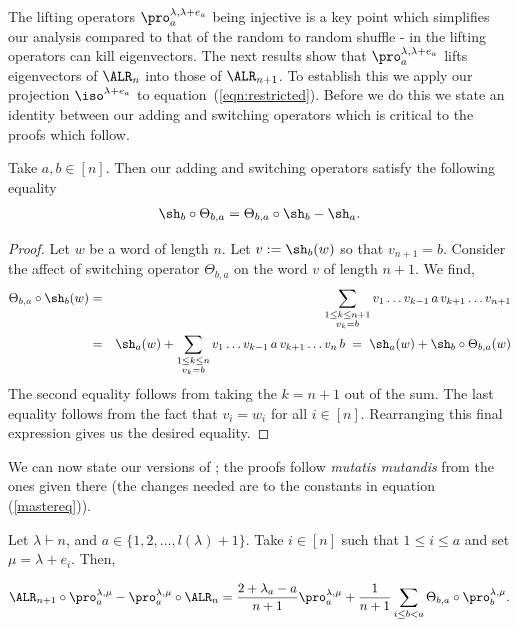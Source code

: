 \documentclass[11pt]{report}
\begin{document}
The lifting operators $\pro^{\lambda, \lambda + e_{a}}_{a}$ 
being injective is a key point which simplifies our analysis  
compared to that of the random to random shuffle - in \cite{dieker2018spectral} the lifting operators can kill 
eigenvectors. The next results 
show that $\pro_{a}^{\lambda,\lambda+e_{a}}$ lifts eigenvectors 
of 
$\ALR_{n}$ into those of $\ALR_{n+1}$. 
To establish this we apply our projection $\iso^{\lambda+e_{a}}$ to 	equation~(\ref{eqn:restricted}). Before we do this we state an identity between our adding and switching operators which is critical to the proofs which follow.

\begin{lemma}
	Take $a,b \in [n]$. Then our adding and switching operators satisfy the following equality
	\begin{eqnarray}
	\sh_{b} \circ \Theta_{b,a} = \Theta_{b,a} \circ \sh_{b}  -\sh_{a} .\label{chpt5:eqn:addswtichequally}
	\end{eqnarray}
\end{lemma}
\begin{proof}
	Let $w$ be a word of length $n$. Let $v := \sh_{b}(w)$ so that $v_{n+1} =b$. Consider the affect of switching operator $\Theta_{b,a}$ on the word $v$ of length $n+1$. We find,
	\begin{eqnarray*}
		\Theta_{b,a} \circ \sh_{b}(w)  & =  &\sum_{\substack{1\leq k \leq n+1 \\ v_{k}=b}} v_{1} \ldots v_{k-1} \, a\, v_{k+1} \ldots v_{n+1} \\
		& = & \sh_{a}(w) + \sum_{\substack{1\leq k \leq n \\ v_{k}=b}} v_{1} \ldots v_{k-1} \, a\, v_{k+1} \ldots v_{n} \,b  \; = \;\sh_{a}(w) + \sh_{b}\circ\Theta_{b,a}(w)
	\end{eqnarray*}
	The second equality follows from taking the $k=n+1$ out of the sum. The last equality follows from the fact that $v_{i} = w_{i}$ for all $i \in[n]$. Rearranging this final expression gives us the desired equality.
\end{proof}

We can now state our versions of \cite[Lemma 
48, Theorem 49]{dieker2018spectral};
the proofs follow \emph{mutatis mutandis} from the ones given there (the 
changes 
needed are to the constants in equation (\ref{mastereq})).

\begin{lemma}
	\label{chpt5:lem:lifting}
	Let $\lambda \vdash n$, and  $a \in \{1,2,\ldots,l(\lambda)+1\}$. Take $i\in [n]$ such that  $1 \leq i \leq a$ and set $\mu = \lambda +e_{i}$. Then,
	
	
	
	\[	\ALR_{n+1} \circ \pro_{a}^{\lambda,\mu} - 
	\pro_{a}^{\lambda,\mu} \circ \ALR_{n} = \frac{2 
		+\lambda_{a} -a}{n+1}\pro_{a}^{\lambda,\mu} + 
	\frac{1}{n+1}\sum_{i \leq b < a} \Theta_{b,a} \circ 
	\pro_{b}^{\lambda,\mu}.\]
	
\end{lemma}
\end{document}
